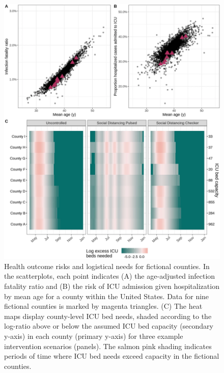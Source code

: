 \begin{figure}[!htb]%
    \centering
    \includegraphics{fig_pipeline/fig3a}
    \caption[Health outcome risks and logistical needs for fictional counties]{Health outcome risks and logistical needs for fictional counties. In the scatterplots, each point indicates (A) the age-adjusted infection fatality ratio and (B) the risk of ICU admission given hospitalization by mean age for a county within the United States. Data for nine fictional counties is marked by magenta triangles. (C) The heat maps display county-level ICU bed needs, shaded according to the log-ratio above or below the assumed ICU bed capacity (secondary y-axis) in each county (primary y-axis) for three example intervention scenarios (panels). The salmon pink shading indicates periods of time where ICU bed needs exceed capacity in the fictional counties.}
    \label{fig:pipeline-outcome}
\end{figure}

